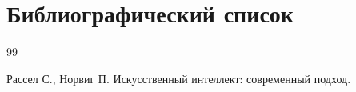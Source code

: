 
\newpage
\section*{Библиографический список}

\begin{thebibliography}{99}

Рассел С., Норвиг П.
Искусственный интеллект: современный подход.

\end{thebibliography}
